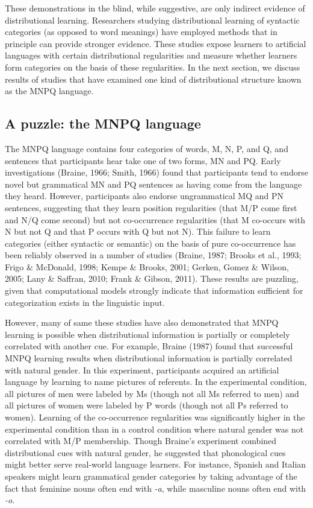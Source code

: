 \documentclass[man,floatsintext]{apa6}
\begin{document}
These demonstrations in the blind, while suggestive, are only indirect evidence of distributional learning. Researchers studying distributional learning of syntactic categories (as opposed to word meanings) have employed methods that in principle can provide stronger evidence. These studies expose learners to artificial languages with certain distributional regularities and measure whether learners form categories on the basis of these regularities. In the next section, we discuss results of studies that have examined one kind of distributional structure known as the MNPQ language.

\subsection{A puzzle: the MNPQ language}

The MNPQ language contains four categories of words, M, N, P, and Q, and sentences that participants hear take one of two forms, MN and PQ. Early investigations (Braine, 1966; Smith, 1966) found that participants tend to endorse novel but grammatical MN and PQ sentences as having come from the language they heard. However, participants also endorse ungrammatical MQ and PN sentences, suggesting that they learn position regularities (that M/P come first and N/Q come second) but not co-occurrence regularities (that M co-occurs with N but not Q and that P occurs with Q but not N). This failure to learn categories (either syntactic or semantic) on the basis of pure co-occurrence has been reliably observed in a number of studies (Braine, 1987; Brooks et al., 1993; Frigo \& McDonald, 1998; Kempe \& Brooks, 2001; Gerken, Gomez \& Wilson, 2005; Lany \& Saffran, 2010; Frank \& Gibson, 2011). These results are puzzling, given that computational models strongly indicate that information sufficient for categorization exists in the linguistic input.

However, many of same these studies have also demonstrated that MNPQ learning is possible when distributional information is partially or completely correlated with another cue. For example, Braine (1987) found that successful MNPQ learning results when distributional information is partially correlated with natural gender. In this experiment, participants acquired an artificial language by learning to name pictures of referents. In the experimental condition, all pictures of men were labeled by Ms (though not all Ms referred to men) and all pictures of women were labeled by P words (though not all Ps referred to women). Learning of the co-occurrence regularities was significantly higher in the experimental condition than in a control condition where natural gender was not correlated with M/P membership. Though Braine's experiment combined distributional cues with natural gender, he suggested that phonological cues might better serve real-world language learners. For instance, Spanish and Italian speakers might learn grammatical gender categories by taking advantage of the fact that feminine nouns often end with \emph{-a}, while masculine nouns often end with \emph{-o}.
\end{document}
